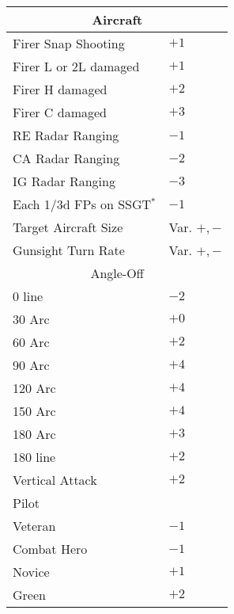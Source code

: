 \begin{TABLE}


\begin{tabularx}{0.7\linewidth}{Xl}
\hline
\multicolumn{2}{c}{Aircraft}\\
\hline
Firer Snap Shooting&$+1$\\
Firer L or 2L damaged&$+1$\\
Firer H damaged&$+2$\\
Firer C damaged&$+3$\\
RE Radar Ranging&$-1$\\
CA Radar Ranging&$-2$\\
IG Radar Ranging&$-3$\\
Each 1/3d FPs on SSGT$^*$&$-1$\\
Target Aircraft Size&Var. $+,-$\\
Gunsight Turn Rate&Var. $+,-$\\
\hline
\multicolumn{2}{c}{Angle-Off}\\
\hline
0 line&$-2$\\
30 Arc&$+0$\\
60 Arc&$+2$\\
90 Arc&$+4$\\
120 Arc&$+4$\\
150 Arc&$+4$\\
180 Arc&$+3$\\
180 line&$+2$\\
Vertical Attack&$+2$\\
\hline
Pilot\\
\hline
Veteran&$-1$\\
Combat Hero&$-1$\\
Novice&$+1$\\
Green&$+2$\\
\hline
\end{tabularx}
\begin{tablenote}{0.7\linewidth}
\end{tablenote}

\end{TABLE}